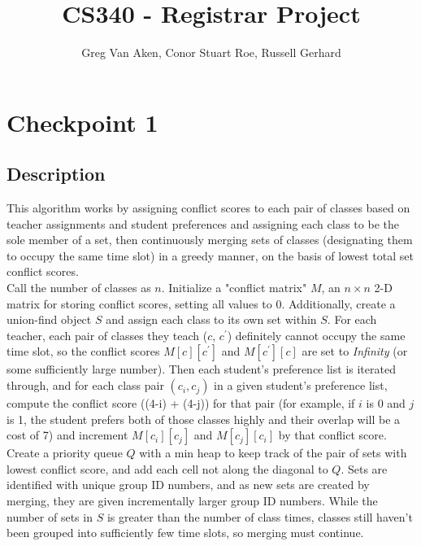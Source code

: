 \documentclass[11pt, oneside]{article}   	%
\title{CS340 - Registrar Project}
\author{Greg Van Aken, Conor Stuart Roe, Russell Gerhard}
\begin{document}
\maketitle

\section{Checkpoint 1}
\subsection{Description}
This algorithm works by assigning conflict scores to each pair of classes based on teacher assignments and student preferences and assigning each class to be the sole member of a set, then continuously merging sets of classes (designating them to occupy the same time slot) in a greedy manner, on the basis of lowest total set conflict scores. \\

Call the number of classes as $n$. Initialize a "conflict matrix" $M$, an $n \times n$ 2-D matrix for storing conflict scores, setting all values to 0. Additionally, create a union-find object $S$ and assign each class to its own set within $S$. For each teacher, each pair of classes they teach ($c$, $c^\prime$) definitely cannot occupy the same time slot, so the conflict scores $M[c][c^\prime]$ and $M[c^\prime][c]$ are set to {\it Infinity} (or some sufficiently large number). Then each student's preference list is iterated through, and for each class pair $(c_i, c_j)$ in a given student's preference list, compute the conflict score ((4-i) + (4-j)) for that pair (for example, if $i$ is 0 and $j$ is 1, the student prefers both of those classes highly and their overlap will be a cost of 7) and increment $M[c_i][c_j]$ and $M[c_j][c_i]$ by that conflict score. \\

Create a priority queue $Q$ with a min heap to keep track of the pair of sets with lowest conflict score, and add each cell not along the diagonal to $Q$. Sets are identified with unique group ID numbers, and as new sets are created by merging, they are given incrementally larger group ID numbers. While the number of sets in $S$ is greater than the number of class times, classes still haven't been grouped into sufficiently few time slots, so merging must continue. \\
\end{document}

